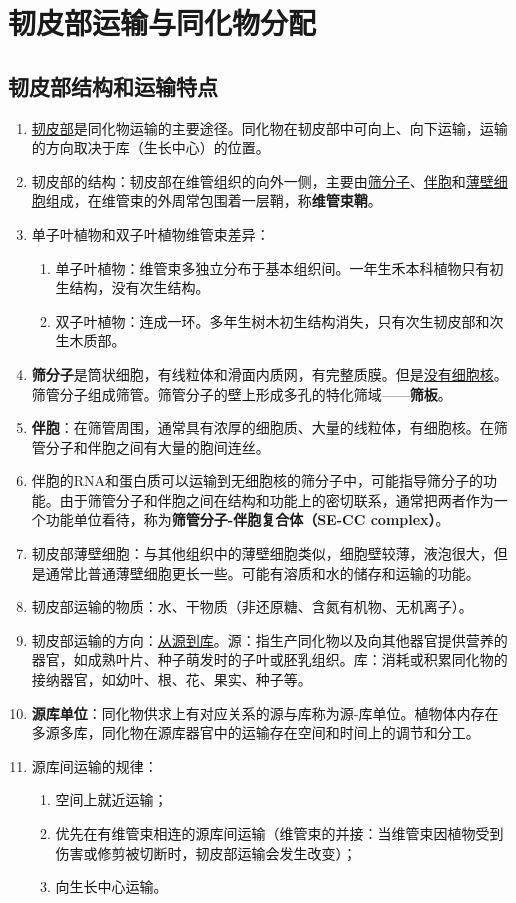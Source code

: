 \chapter{韧皮部运输与同化物分配}
\section{韧皮部结构和运输特点}
\begin{enumerate}
    \item \uline{韧皮部}是同化物运输的主要途径。同化物在韧皮部中可向上、向下运输，运输的方向取决于库（生长中心）的位置。
    \item 韧皮部的结构：韧皮部在维管组织的向外一侧，主要由\uline{筛分子}、\uline{伴胞}和\uline{薄壁细胞}组成，在维管束的外周常包围着一层鞘，称\textbf{维管束鞘}。
    \item 单子叶植物和双子叶植物维管束差异：
    \begin{enumerate}
        \item 单子叶植物：维管束多独立分布于基本组织间。一年生禾本科植物只有初生结构，没有次生结构。
        \item 双子叶植物：连成一环。多年生树木初生结构消失，只有次生韧皮部和次生木质部。
    \end{enumerate}
    \item \textbf{筛分子}是筒状细胞，有线粒体和滑面内质网，有完整质膜。但是\uline{没有细胞核}。筛管分子组成筛管。筛管分子的壁上形成多孔的特化筛域——\textbf{筛板}。
    \item \textbf{伴胞}：在筛管周围，通常具有浓厚的细胞质、大量的线粒体，有细胞核。在筛管分子和伴胞之间有大量的胞间连丝。
    \item 伴胞的RNA和蛋白质可以运输到无细胞核的筛分子中，可能指导筛分子的功能。由于筛管分子和伴胞之间在结构和功能上的密切联系，通常把两者作为一个功能单位看待，称为\textbf{筛管分子-伴胞复合体（SE-CC complex）}。
    \item 韧皮部薄壁细胞：与其他组织中的薄壁细胞类似，细胞壁较薄，液泡很大，但是通常比普通薄壁细胞更长一些。可能有溶质和水的储存和运输的功能。
    \item 韧皮部运输的物质：水、干物质（非还原糖、含氮有机物、无机离子）。
    \item 韧皮部运输的方向：\uline{从源到库}。源：指生产同化物以及向其他器官提供营养的器官，如成熟叶片、种子萌发时的子叶或胚乳组织。库：消耗或积累同化物的接纳器官，如幼叶、根、花、果实、种子等。
    \item \textbf{源库单位}：同化物供求上有对应关系的源与库称为源-库单位。植物体内存在多源多库，同化物在源库器官中的运输存在空间和时间上的调节和分工。
    \item 源库间运输的规律：
    \begin{enumerate}
        \item 空间上就近运输；
        \item 优先在有维管束相连的源库间运输（维管束的并接：当维管束因植物受到伤害或修剪被切断时，韧皮部运输会发生改变）；
        \item 向生长中心运输。
    \end{enumerate}
\end{enumerate}

